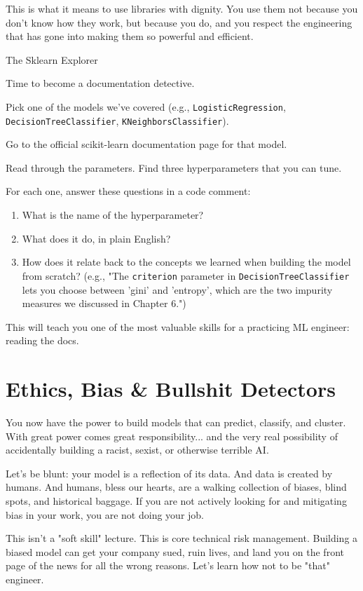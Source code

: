 \documentclass[11pt, letterpaper, openany]{book}
\begin{document}
This is what it means to use libraries with dignity. You use them not because you don't know how they work, but because you do, and you respect the engineering that has gone into making them so powerful and efficient.

\begin{challengebox}
The Sklearn Explorer

Time to become a documentation detective.

Pick one of the models we've covered (e.g., \texttt{LogisticRegression}, \texttt{DecisionTreeClassifier}, \texttt{KNeighborsClassifier}).

Go to the official scikit-learn documentation page for that model.

Read through the parameters. Find three hyperparameters that you can tune.

For each one, answer these questions in a code comment:
\begin{enumerate}
    \item What is the name of the hyperparameter?
    \item What does it do, in plain English?
    \item How does it relate back to the concepts we learned when building the model from scratch? (e.g., "The \texttt{criterion} parameter in \texttt{DecisionTreeClassifier} lets you choose between 'gini' and 'entropy', which are the two impurity measures we discussed in Chapter 6.")
\end{enumerate}
This will teach you one of the most valuable skills for a practicing ML engineer: reading the docs.
\end{challengebox}

\chapter{Ethics, Bias \& Bullshit Detectors}

You now have the power to build models that can predict, classify, and cluster. With great power comes great responsibility... and the very real possibility of accidentally building a racist, sexist, or otherwise terrible AI.

Let's be blunt: your model is a reflection of its data. And data is created by humans. And humans, bless our hearts, are a walking collection of biases, blind spots, and historical baggage. If you are not actively looking for and mitigating bias in your work, you are not doing your job.

This isn't a "soft skill" lecture. This is core technical risk management. Building a biased model can get your company sued, ruin lives, and land you on the front page of the news for all the wrong reasons. Let's learn how not to be "that" engineer.
\end{document}
